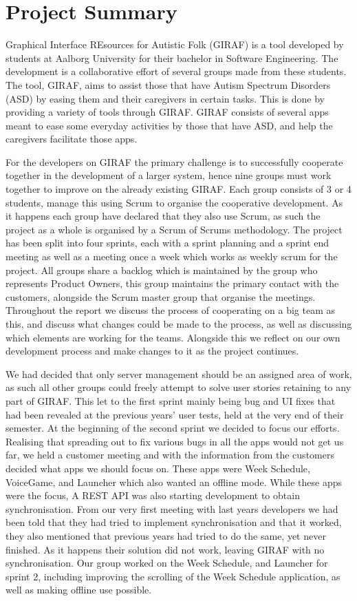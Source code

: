 \section{Project Summary}
Graphical Interface REsources for Autistic Folk (GIRAF) is a tool developed by students at Aalborg University for their bachelor in Software Engineering.
The development is a collaborative effort of several groups made from these students.
The tool, GIRAF, aims to assist those that have Autism Spectrum Disorders (ASD) by easing them and their caregivers in certain tasks.
This is done by providing a variety of tools through GIRAF.
GIRAF consists of several apps meant to ease some everyday activities by those that have ASD, and help the caregivers facilitate those apps.

For the developers on GIRAF the primary challenge is to successfully cooperate together in the development of a larger system, hence nine groups must work together to improve on the already existing GIRAF.
Each group consists of 3 or 4 students, manage this using Scrum to organise the cooperative development.
As it happens each group have declared that they also use Scrum, as such the project as a whole is organised by a Scrum of Scrums methodology.
The project has been split into four sprints, each with a sprint planning and a sprint end meeting as well as a meeting once a week which works as weekly scrum for the project.
All groups share a backlog which is maintained by the group who represents Product Owners, this group maintains the primary contact with the customers, alongside the Scrum master group that organise the meetings.
Throughout the report we discuss the process of cooperating on a big team as this, and discuss what changes could be made to the process, as well as discussing which elements are working for the teams.
Alongside this we reflect on our own development process and make changes to it as the project continues.

\bigskip
We had decided that only server management should be an assigned area of work, as such all other groups could freely attempt to solve user stories retaining to any part of GIRAF.
This let to the first sprint mainly being bug and UI fixes that had been revealed at the previous years' user tests, held at the very end of their semester.
At the beginning of the second sprint we decided to focus our efforts.
Realising that spreading out to fix various bugs in all the apps would not get us far, we held a customer meeting and with the information from the customers decided what apps we should focus on.
These apps were Week Schedule, VoiceGame, and Launcher which also wanted an offline mode.
While these apps were the focus, A REST API was also starting development to obtain synchronisation.
From our very first meeting with last years developers we had been told that they had tried to implement synchronisation and that it worked, they also mentioned that previous years had tried to do the same, yet never finished.
As it happens their solution did not work, leaving GIRAF with no synchronisation.
Our group worked on the Week Schedule, and Launcher for sprint 2, including improving the scrolling of the Week Schedule application, as well as making offline use possible.

